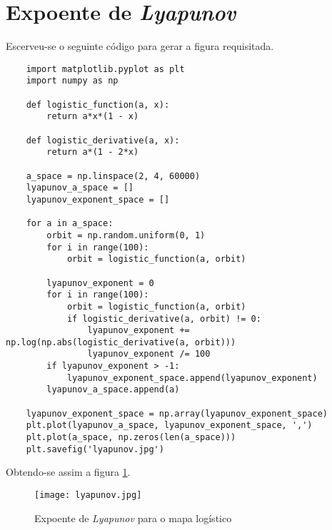 \documentclass{article}[twocolumn]
\begin{document}
	\section{Expoente de \textit{Lyapunov}}
	Escerveu-se o seguinte c\'odigo para gerar a figura requisitada.
	\begin{verbatim}
	import matplotlib.pyplot as plt
	import numpy as np
	
	def logistic_function(a, x):
		return a*x*(1 - x)
	
	def logistic_derivative(a, x):
		return a*(1 - 2*x)
	
	a_space = np.linspace(2, 4, 60000)
	lyapunov_a_space = []
	lyapunov_exponent_space = []
	
	for a in a_space:
		orbit = np.random.uniform(0, 1)
		for i in range(100):
			orbit = logistic_function(a, orbit)
			
		lyapunov_exponent = 0
		for i in range(100):
			orbit = logistic_function(a, orbit)
			if logistic_derivative(a, orbit) != 0:
				lyapunov_exponent += np.log(np.abs(logistic_derivative(a, orbit)))
				lyapunov_exponent /= 100
		if lyapunov_exponent > -1:
			lyapunov_exponent_space.append(lyapunov_exponent)
		lyapunov_a_space.append(a)
		
	lyapunov_exponent_space = np.array(lyapunov_exponent_space)
	plt.plot(lyapunov_a_space, lyapunov_exponent_space, ',')
	plt.plot(a_space, np.zeros(len(a_space)))
	plt.savefig('lyapunov.jpg')

	\end{verbatim}
	Obtendo-se assim a figura \ref{fig:lyapunov}.
	\begin{figure}[H]
		\centering
		\texttt{[image: lyapunov.jpg]}
		\caption{Expoente de \textit{Lyapunov} para o mapa log\'istico}
		\label{fig:lyapunov}
	\end{figure}
\end{document}
